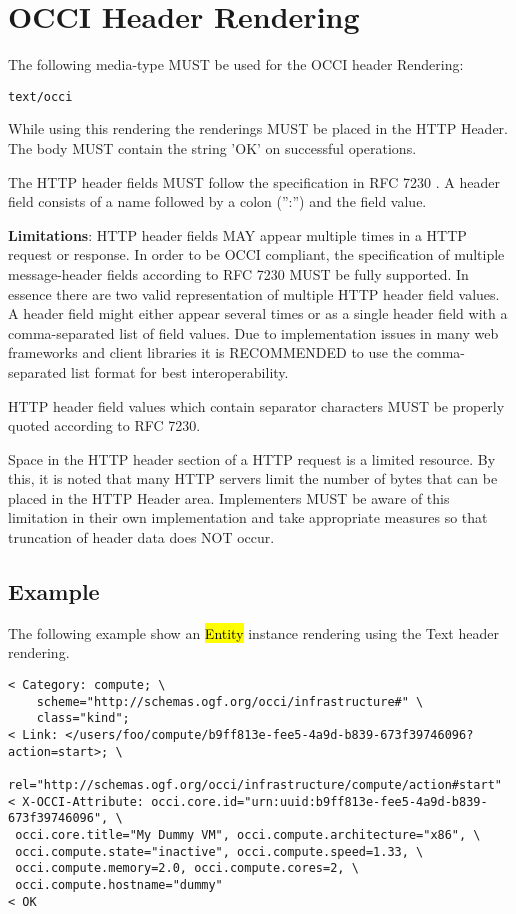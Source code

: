 \documentclass[10pt,a4paper]{article}
\begin{document}
\section{OCCI Header Rendering}
\label{sec:header}
The following media-type MUST be used for the OCCI header Rendering:

{\tt text/occi}

While using this rendering the renderings MUST be placed in the HTTP Header. The body MUST contain the string ’OK’ on successful operations.

The HTTP header fields MUST follow the specification in RFC 7230 \cite{rfc7230}. A header field consists of a name followed by a colon (”:”) and the field value.

\textbf{Limitations}: HTTP header fields MAY appear multiple times in a HTTP request or response. In order to be OCCI compliant, the specification of multiple message-header fields according to RFC 7230 MUST be fully supported. In essence there are two valid representation of multiple HTTP header field values. A header field might either appear several times or as a single header field with a comma-separated list of field values. Due to implementation issues in many web frameworks and client libraries it is RECOMMENDED to use the comma-separated list format for best interoperability.

HTTP header field values which contain separator characters MUST be properly quoted according to RFC 7230.

Space in the HTTP header section of a HTTP request is a limited resource. By this, it is noted that many HTTP servers limit the number of bytes that can be placed in the HTTP Header area. Implementers MUST be aware of this limitation in their own implementation and take appropriate measures so that truncation of header data does NOT occur.

\subsection{Example}

The following example show an \hl{Entity} instance rendering using the Text header rendering.

\begin{verbatim}
< Category: compute; \
    scheme="http://schemas.ogf.org/occi/infrastructure#" \
    class="kind";
< Link: </users/foo/compute/b9ff813e-fee5-4a9d-b839-673f39746096?action=start>; \
    rel="http://schemas.ogf.org/occi/infrastructure/compute/action#start"
< X-OCCI-Attribute: occi.core.id="urn:uuid:b9ff813e-fee5-4a9d-b839-673f39746096", \
 occi.core.title="My Dummy VM", occi.compute.architecture="x86", \
 occi.compute.state="inactive", occi.compute.speed=1.33, \
 occi.compute.memory=2.0, occi.compute.cores=2, \
 occi.compute.hostname="dummy"
< OK
\end{verbatim}
\end{document}
